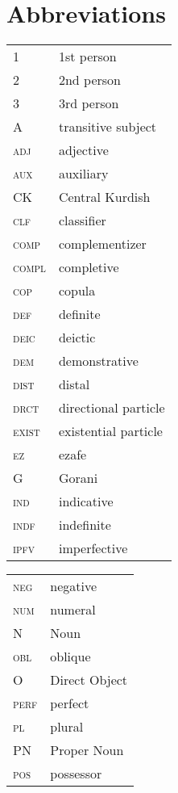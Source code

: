 \documentclass[output=paper,colorlinks,citecolor=brown]{langscibook}
\begin{document}
\begin{sloppypar}
\section*{Abbreviations}
\begin{tabularx}{.5\textwidth}{@{}lQ@{}}
1 & 1st person \\
2 & 2nd person \\
3 & 3rd person \\
A & transitive subject \\
\textsc{adj} 	&adjective \\
\textsc{aux} 	&auxiliary \\
CK & Central Kurdish \\
\textsc{clf}  & classifier \\
\textsc{comp}  &complementizer \\
\textsc{compl} & completive \\
\textsc{cop} & copula \\
\textsc{def} & definite \\
\textsc{deic} & deictic \\ 
\textsc{dem} & demonstrative \\
\textsc{dist} & distal \\
\textsc{drct} & directional particle \\
\textsc{exist} & existential particle \\
\textsc{ez} & ezafe \\
G  & Gorani \\
\textsc{ind} & indicative \\
\textsc{indf} & indefinite \\
\textsc{ipfv} & imperfective \\ %
\end{tabularx}%
\begin{tabularx}{.5\textwidth}{@{}lQ@{}}
\textsc{neg}  & negative \\
\textsc{num} & numeral \\
N& Noun \\
\textsc{obl} & oblique \\
O & Direct Object \\
\textsc{perf} & perfect \\
\textsc{pl} & plural \\
PN& Proper Noun \\
\textsc{pos}  & possessor \\

\end{tabularx}
\end{sloppypar}
\end{document}
